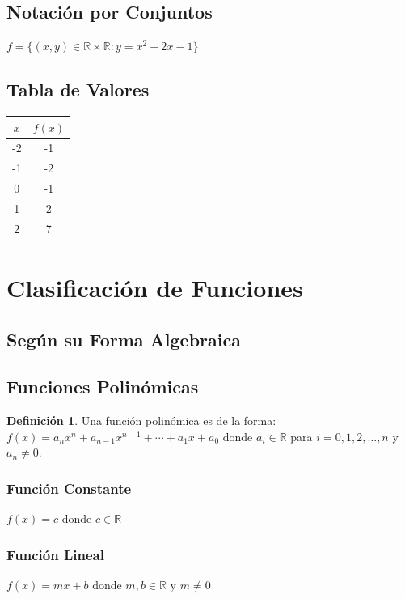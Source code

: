 \documentclass[12pt, a4paper, oneside]{book}
\theoremstyle{definition}
\newtheorem{definicion}{Definición}[chapter]
\begin{document}
\subsection{Notación por Conjuntos}
$f = \{(x,y) \in \mathbb{R} \times \mathbb{R} : y = x^2 + 2x - 1\}$

\subsection{Tabla de Valores}
\begin{center}
\begin{tabular}{|c|c|}
\hline
$x$ & $f(x)$ \\
\hline
-2 & -1 \\
-1 & -2 \\
0 & -1 \\
1 & 2 \\
2 & 7 \\
\hline
\end{tabular}
\end{center}

\section{Clasificación de Funciones}

\subsection{Según su Forma Algebraica}

\subsection{Funciones Polinómicas}

\begin{definicion}
Una función polinómica es de la forma:
$f(x) = a_n x^n + a_{n-1} x^{n-1} + \cdots + a_1 x + a_0$
donde $a_i \in \mathbb{R}$ para $i = 0, 1, 2, \ldots, n$ y $a_n \neq 0$.
\end{definicion}

\subsubsection{Función Constante}
$f(x) = c \text{ donde } c \in \mathbb{R}$

\subsubsection{Función Lineal}
$f(x) = mx + b \text{ donde } m, b \in \mathbb{R} \text{ y } m \neq 0$
\end{document}
